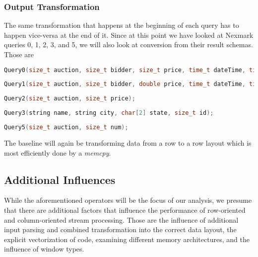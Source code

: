 \subsubsection{Output Transformation}

The same transformation that happens at the beginning of each query has to happen vice-versa at the end of it.
Since at this point we have looked at Nexmark queries 0, 1, 2, 3, and 5, we will also look at conversion from their result schemas.
Those are

\begin{lstlisting}[language=c++]
Query0(size_t auction, size_t bidder, size_t price, time_t dateTime, time_t expires, string extra);
\end{lstlisting}

\begin{lstlisting}[language=c++]
Query1(size_t auction, size_t bidder, double price, time_t dateTime, time_t expires, string extra);
\end{lstlisting}

\begin{lstlisting}[language=c++]
Query2(size_t auction, size_t price);
\end{lstlisting}
    
\begin{lstlisting}[language=c++]
Query3(string name, string city, char[2] state, size_t id);
\end{lstlisting}

\begin{lstlisting}[language=c++]
Query5(size_t auction, size_t num);
\end{lstlisting}

The baseline will again be transforming data from a row to a row layout which is most efficiently done by a \emph{memcpy}.

\subsection{Additional Influences}

While the aforementioned operators will be the focus of our analysis, we presume that there are additional factors that influence the performance of row-oriented and column-oriented stream processing.
Those are the influence of additional input parsing and combined transformation into the correct data layout, the explicit vectorization of code, examining different memory architectures, and the influence of window types.

